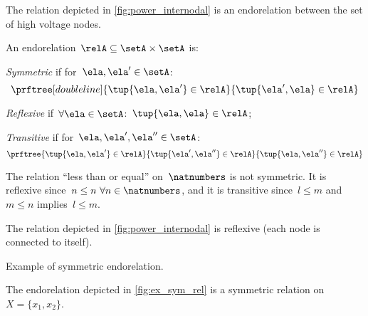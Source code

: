 \begin{example}
    The relation depicted in \cref{fig:power_internodal} is an endorelation between the set of high voltage nodes.
\end{example}

\begin{definition}
    \label{def:properties-endorelations}
    An endorelation~$\relA\subseteq \setA\times \setA$ is:
    \begin{compactitem}
        \item \emph{Symmetric} if for~$\ela, \ela'\in \setA$:
        \begin{equation*}
            \prftree[double line]{\tup{\ela,\ela'}\in \relA}{\tup{\ela',\ela}\in \relA}
        \end{equation*}
        \item \emph{Reflexive} if~$\forall \ela\in \setA$:~$\tup{\ela,\ela}\in \relA$;
        \item \emph{Transitive} if for~$\ela, \ela', \ela'' \in \setA$:
        \begin{equation*}
            \prftree{\tup{\ela,\ela'}\in \relA}{\tup{\ela',\ela''}\in \relA}{\tup{\ela, \ela''}\in \relA}
        \end{equation*}
    \end{compactitem}
\end{definition}

\begin{example}
    The relation ``less than or equal'' on~$\natnumbers$ is not symmetric. It is reflexive since~$n\leq n \ \forall n\in \natnumbers$, and it is transitive since~$l\leq m$ and~$m\leq n$ implies~$l\leq m$.
\end{example}

\begin{example}
    The relation depicted in \cref{fig:power_internodal} is reflexive (each node is connected to itself).
\end{example}
\begin{marginfigure}
    \centering
    \caption{Example of symmetric endorelation.}
    \label{fig:ex_sym_rel}
\end{marginfigure}
\begin{example}
    The endorelation depicted in \cref{fig:ex_sym_rel} is a symmetric relation on~$X=\{x_1,x_2\}$.
\end{example}

